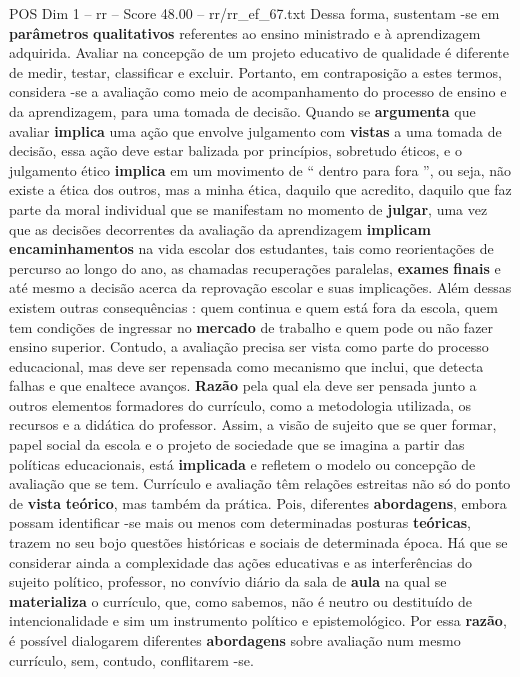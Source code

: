 \begin{textsample}{POS Dim 1 – rr – Score 48.00 – rr/rr\_ef\_67.txt}
Dessa forma, sustentam -se em \textbf{parâmetros} \textbf{qualitativos} referentes ao ensino ministrado e à aprendizagem adquirida.
Avaliar na concepção de um projeto educativo de qualidade é diferente de medir, testar, classificar e excluir.
Portanto, em contraposição a estes termos, considera -se a avaliação como meio de acompanhamento do processo de ensino e da aprendizagem, para uma tomada de decisão.
Quando se \textbf{argumenta} que avaliar \textbf{implica} uma ação que envolve julgamento com \textbf{vistas} a uma tomada de decisão, essa ação deve estar balizada por princípios, sobretudo éticos, e o julgamento ético \textbf{implica} em um movimento de “ dentro para fora ”, ou seja, não existe a ética dos outros, mas a minha ética, daquilo que acredito, daquilo que faz parte da moral individual que se manifestam no momento de \textbf{julgar}, uma vez que as decisões decorrentes da avaliação da aprendizagem \textbf{implicam} \textbf{encaminhamentos} na vida escolar dos estudantes, tais como reorientações de percurso ao longo do ano, as chamadas recuperações paralelas, \textbf{exames} \textbf{finais} e até mesmo a decisão acerca da reprovação escolar e suas implicações.
Além dessas existem outras consequências : quem continua e quem está fora da escola, quem tem condições de ingressar no \textbf{mercado} de trabalho e quem pode ou não fazer ensino superior.
Contudo, a avaliação precisa ser vista como parte do processo educacional, mas deve ser repensada como mecanismo que inclui, que detecta falhas e que enaltece avanços. \textbf{Razão} pela qual ela deve ser pensada junto a outros elementos formadores do currículo, como a metodologia utilizada, os recursos e a didática do professor.
Assim, a visão de sujeito que se quer formar, papel social da escola e o projeto de sociedade que se imagina a partir das políticas educacionais, está \textbf{implicada} e refletem o modelo ou concepção de avaliação que se tem.
Currículo e avaliação têm relações estreitas não só do ponto de \textbf{vista} \textbf{teórico}, mas também da prática.
Pois, diferentes \textbf{abordagens}, embora possam identificar -se mais ou menos com determinadas posturas \textbf{teóricas}, trazem no seu bojo questões históricas e sociais de determinada época.
Há que se considerar ainda a complexidade das ações educativas e as interferências do sujeito político, professor, no convívio diário da sala de \textbf{aula} na qual se \textbf{materializa} o currículo, que, como sabemos, não é neutro ou destituído de intencionalidade e sim um instrumento político e epistemológico.
Por essa \textbf{razão}, é possível dialogarem diferentes \textbf{abordagens} sobre avaliação num mesmo currículo, sem, contudo, conflitarem -se.

\end{textsample}
